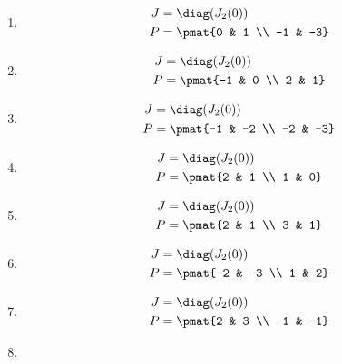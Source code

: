 \begin{enumerate}
\item

\begin{align*}
J &= \diag(J_{2}(0))\\
P &= \pmat{0 & 1 \\ -1 & -3}
\end{align*}

\item

\begin{align*}
J &= \diag(J_{2}(0))\\
P &= \pmat{-1 & 0 \\ 2 & 1}
\end{align*}

\item

\begin{align*}
J &= \diag(J_{2}(0))\\
P &= \pmat{-1 & -2 \\ -2 & -3}
\end{align*}

\item

\begin{align*}
J &= \diag(J_{2}(0))\\
P &= \pmat{2 & 1 \\ 1 & 0}
\end{align*}

\item

\begin{align*}
J &= \diag(J_{2}(0))\\
P &= \pmat{2 & 1 \\ 3 & 1}
\end{align*}

\item

\begin{align*}
J &= \diag(J_{2}(0))\\
P &= \pmat{-2 & -3 \\ 1 & 2}
\end{align*}

\item

\begin{align*}
J &= \diag(J_{2}(0))\\
P &= \pmat{2 & 3 \\ -1 & -1}
\end{align*}

\item


\end{enumerate}
